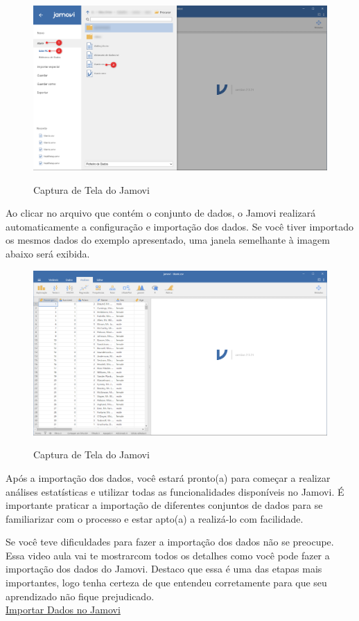 \begin{figure}[H]
  \centering
  \caption{Captura de Tela do Jamovi}
  \includegraphics[width=\textwidth]{imagens/cap_1/importa_dados_2.png}
  \label{fig:importa_dados_2}
\end{figure}

Ao clicar no arquivo que contém o conjunto de dados, o Jamovi realizará automaticamente a configuração e importação dos dados. Se você tiver importado os mesmos dados do exemplo apresentado, uma janela semelhante à imagem abaixo será exibida.

\begin{figure}[H]
  \centering
  \caption{Captura de Tela do Jamovi}
  \includegraphics[width=\textwidth]{imagens/cap_1/jamovi_arquivo_importado.png}
  \label{fig:jamovi_arquivo_importado}
\end{figure}

Após a importação dos dados, você estará pronto(a) para começar a realizar análises estatísticas e utilizar todas as funcionalidades disponíveis no Jamovi. É importante praticar a importação de diferentes conjuntos de dados para se familiarizar com o processo e estar apto(a) a realizá-lo com facilidade.

\begin{tcolorbox}[colback=white,colframe=green!50!black,title= Dica de Conteúdo]
  Se você teve dificuldades para fazer a importação dos dados não se preocupe. Essa video aula vai te mostrarcom todos os detalhes como você pode fazer a importação dos dados do Jamovi. Destaco que essa é uma das etapas mais importantes, logo tenha certeza de que entendeu corretamente para que seu aprendizado não fique prejudicado.\\
  \faYoutube{} \href{https://www.youtube.com/watch?v=NIpt0wIq5pc&t=1s}{Importar Dados no Jamovi}
\end{tcolorbox}